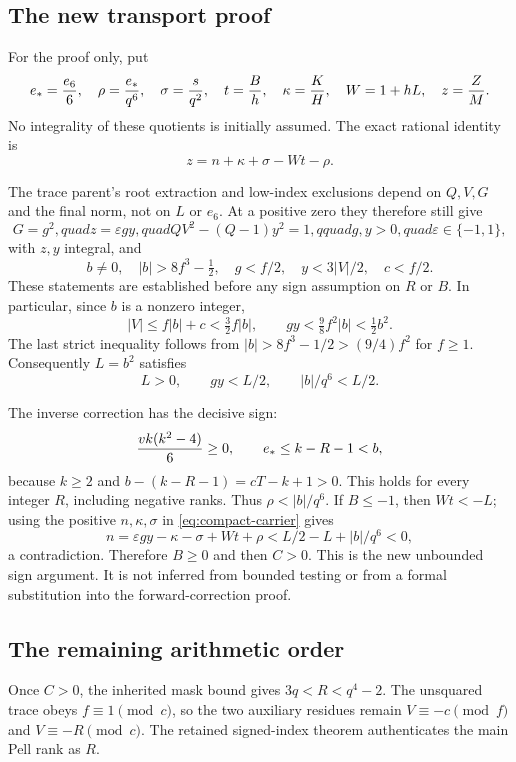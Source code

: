 \subsection{The new transport proof}

For the proof only, put
\[
 e_*={e_6\over6},\quad \rho={e_*\over q^6},\quad
 \sigma={s\over q^2},\quad t={B\over h},\quad
 \kappa={K\over H},\quad W=1+hL,\quad z={Z\over M}.
\]
No integrality of these quotients is initially assumed.  The exact
rational identity is
\begin{equation}
 z=n+\kappa+\sigma-Wt-\rho.\label{eq:compact-carrier}
\end{equation}

The trace parent's root extraction and low-index exclusions depend on
$Q,V,G$ and the final norm, not on $L$ or $e_6$.
At a positive zero they therefore still give
\[
 G=g^2,quad z=\varepsilon gy,quad
 QV^2-(Q-1)y^2=1,qquad g,y>0,quad\varepsilon\in\{-1,1\},
\]
with $z,y$ integral, and
\[
 b\ne0,\quad |b|>8f^3-\tfrac12,\quad
 g<f/2,\quad y<3|V|/2,\quad c<f/2.
\]
These statements are established before any sign assumption on $R$ or $B$.
In particular, since $b$ is a nonzero integer,
\[
 |V|\le f|b|+c<\tfrac32 f|b|,
 \qquad
 gy<\tfrac98 f^2|b|<\tfrac12 b^2.
\]
The last strict inequality follows from
$|b|>8f^3-1/2>(9/4)f^2$ for $f\ge1$.
Consequently $L=b^2$ satisfies
\[
 L>0,\qquad gy<L/2,\qquad |b|/q^6<L/2.
\]

The inverse correction has the decisive sign:
\[
 {vk(k^2-4)\over6}\ge0,
 \qquad e_*\le k-R-1<b,
\]
because $k\ge2$ and $b-(k-R-1)=cT-k+1>0$.
This holds for every integer $R$, including negative ranks.  Thus
$\rho<|b|/q^6$.  If $B\le-1$, then $Wt<-L$; using the positive
$n,\kappa,\sigma$ in \eqref{eq:compact-carrier} gives
\[
 n=\varepsilon gy-\kappa-\sigma+Wt+\rho
   <L/2-L+|b|/q^6<0,
\]
a contradiction.  Therefore $B\ge0$ and then $C>0$.
This is the new unbounded sign argument.  It is not inferred from
bounded testing or from a formal substitution into the forward-correction
proof.

\subsection{The remaining arithmetic order}

Once $C>0$, the inherited mask bound gives $3q<R<q^4-2$.
The unsquared trace obeys $f\equiv1\pmod c$, so the two auxiliary
residues remain
$V\equiv-c\pmod f$ and $V\equiv-R\pmod c$.
The retained signed-index theorem authenticates the main Pell rank as $R$.

